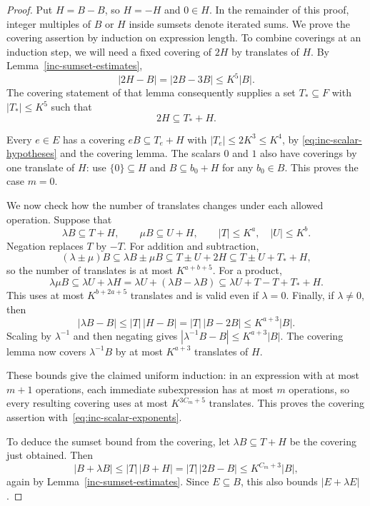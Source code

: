 \begin{proof}
Put $H=B-B$, so $H=-H$ and $0\in H$. In the remainder of this proof,
integer multiples of $B$ or $H$ inside sumsets denote iterated sums.
We prove the covering assertion by induction on expression length.
To combine coverings at an induction step, we will need a fixed
covering of $2H$ by translates of $H$. By
Lemma~\ref{inc-sumset-estimates},
\[
 |2H-B|=|2B-3B|\le K^5|B|.
\]
The covering statement of that lemma consequently supplies a set
$T_*\subseteq F$ with $|T_*|\le K^5$ such that
\begin{equation}\label{eq:inc-two-differences-cover}
 2H\subseteq T_*+H.
\end{equation}

Every $e\in E$ has a covering $eB\subseteq T_e+H$ with
$|T_e|\le2K^3\le K^4$, by
\eqref{eq:inc-scalar-hypotheses} and the covering lemma.
The scalars $0$ and $1$ also have coverings by one translate of $H$:
use $\{0\}\subseteq H$ and $B\subseteq b_0+H$ for any $b_0\in B$.
This proves the case $m=0$.

We now check how the number of translates changes under each allowed
operation. Suppose that
\[
 \lambda B\subseteq T+H,\qquad
 \mu B\subseteq U+H,\qquad
 |T|\le K^a,\quad |U|\le K^b.
\]
Negation replaces $T$ by $-T$. For addition and subtraction,
\[
 (\lambda\pm\mu)B
 \subseteq \lambda B\pm\mu B
 \subseteq T\pm U+2H
 \subseteq T\pm U+T_*+H,
\]
so the number of translates is at most $K^{a+b+5}$. For a product,
\[
 \lambda\mu B
 \subseteq \lambda U+\lambda H
 =\lambda U+(\lambda B-\lambda B)
 \subseteq\lambda U+T-T+T_*+H.
\]
This uses at most $K^{b+2a+5}$ translates and is valid even if
$\lambda=0$. Finally, if $\lambda\ne0$, then
\[
 |\lambda B-B|
 \le |T|\,|H-B|
 =|T|\,|B-2B|
 \le K^{a+3}|B|.
\]
Scaling by $\lambda^{-1}$ and then negating gives
$|\lambda^{-1}B-B|\le K^{a+3}|B|$. The covering lemma now covers
$\lambda^{-1}B$ by at most $K^{a+3}$ translates of $H$.

These bounds give the claimed uniform induction: in an expression
with at most $m+1$ operations, each immediate subexpression has at
most $m$ operations, so every resulting covering uses at most
$K^{3C_m+5}$ translates. This proves the covering assertion
with~\eqref{eq:inc-scalar-exponents}.

To deduce the sumset bound from the covering, let
$\lambda B\subseteq T+H$ be the covering just obtained. Then
\[
 |B+\lambda B|
 \le |T|\,|B+H|
 =|T|\,|2B-B|
 \le K^{C_m+3}|B|,
\]
again by Lemma~\ref{inc-sumset-estimates}. Since $E\subseteq B$,
this also bounds $|E+\lambda E|$.
\end{proof}

